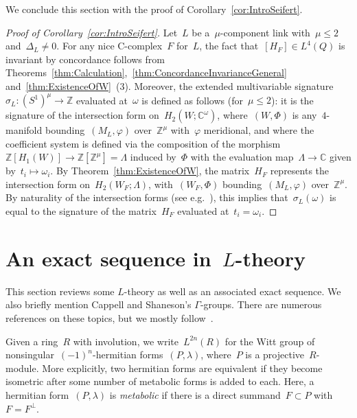 \documentclass[10.9pt,a4paper]{amsart}
\theoremstyle{definition}
\theoremstyle{remark}
\newcommand{\Z}{\mathbb{Z}}
\newcommand{\C}{\mathbb{C}}
\begin{document}
We conclude this section with the proof of Corollary~\ref{cor:IntroSeifert}.

\begin{proof}[Proof of Corollary~\ref{cor:IntroSeifert}]
Let~$L$ be a~$\mu$-component link with~$\mu\le 2$ and~$\Delta_L\neq 0$.
For any nice C-complex~$F$ for~$L$, the fact that~$[H_F]\in L^4(Q)$ is invariant by concordance follows from
Theorems~\ref{thm:Calculation},~\ref{thm:ConcordanceInvarianceGeneral} and~\ref{thm:ExistenceOfW}~(3).
Moreover, the extended multivariable signature~$\sigma_L\colon(S^1)^\mu\to\Z$ evaluated at~$\omega$ is defined as follows (for~$\mu\le 2$): it is the signature of the intersection form on~$H_2(W;\C^\omega)$, where~$(W,\Phi)$ is any~$4$-manifold bounding~$(M_L,\varphi)$ over~$\Z^\mu$ with~$\varphi$ meridional, and where the coefficient system is defined via the composition of the morphism~$\Z[H_1(W)]\to\Z[\Z^\mu]=\Lambda$ induced by~$\Phi$ with the evaluation map~$\Lambda\to\C$ given by~$t_i\mapsto\omega_i$.
By Theorem~\ref{thm:ExistenceOfW}, the matrix~$H_F$ represents the intersection form on~$H_2(W_F;\Lambda)$,
with~$(W_F,\Phi)$ bounding~$(M_L,\varphi)$ over~$\Z^\mu$.
By naturality of the intersection forms (see e.g.~\cite[Appendix~B]{CMP}), this implies that~$\sigma_L(\omega)$
is equal to the signature of the matrix~$H_F$ evaluated at~$t_i=\omega_i$.
\end{proof}


\appendix


\section{An exact sequence in~$L$-theory}
\label{sub:Ltheory}

This section reviews some $L$-theory as well as an associated exact sequence.
We also briefly mention Cappell and Shaneson's $\Gamma$-groups.
There are numerous references on these topics, but we mostly follow~\cite{Karoubi,CappellShaneson,CarlssonMilgram,Ranicki}.

\medbreak



Given a ring~$R$ with involution, we write~$L^{2n}(R)$ for the Witt group of nonsingular~$(-1)^n$-hermitian forms~$(P,\lambda)$, where~$P$ is a projective~$R$-module. 
More explicitly,  two hermitian forms are equivalent if they become isometric after some number of metabolic forms is added to each.
Here, a hermitian form~$(P,\lambda)$ is \emph{metabolic} if there is a direct summand~$F \subset P$ with~$F=F^\perp$.
\end{document}
